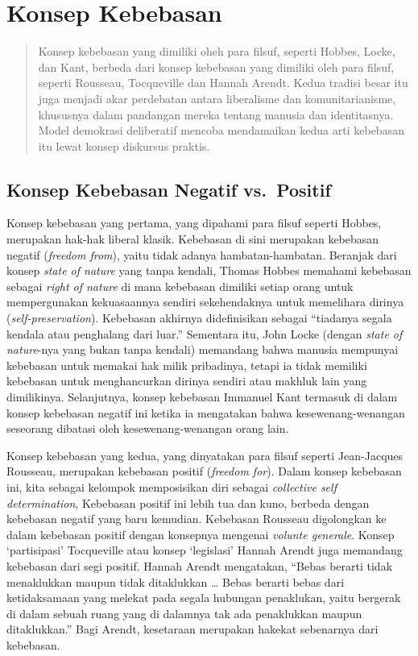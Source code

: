 \documentclass[11pt,twoside,a5paper,openany]{memoir}
\begin{document}
\hypertarget{konsep-kebebasan}{%
\section{Konsep Kebebasan}\label{konsep-kebebasan}}

\begin{quote}
Konsep kebebasan yang dimiliki oheh para filsuf, seperti Hobbes, Locke,
dan Kant, berbeda dari konsep kebebasan yang dimiliki oleh para filsuf,
seperti Rousseau, Tocqueville dan Hannah Arendt. Kedua tradisi besar itu
juga menjadi akar perdebatan antara liberalisme dan komunitarianisme,
khususnya dalam pandangan mereka tentang manusia dan identitasnya. Model
demokrasi deliberatif mencoba mendamaikan kedua arti kebebasan itu lewat
konsep diskursus praktis.
\end{quote}

\hypertarget{konsep-kebebasan-negatif-vs.-positif}{%
\subsection{Konsep Kebebasan Negatif
vs.~Positif}\label{konsep-kebebasan-negatif-vs.-positif}}

Konsep kebebasan yang pertama, yang dipahami para filsuf seperti Hobbes,
merupakan hak-hak liberal klasik. Kebebasan di sini merupakan kebebasan
negatif (\emph{freedom from}), yaitu tidak adanya hambatan-hambatan.
Beranjak dari konsep \emph{state of nature} yang tanpa kendali, Thomas
Hobbes memahami kebebasan sebagai \emph{right of nature} di mana
kebebasan dimiliki setiap orang untuk mempergunakan kekuasaannya sendiri
sekehendaknya untuk memelihara dirinya (\emph{self-preservation}).
Kebebasan akhirnya didefinisikan sebagai ``tiadanya segala kendala atau
penghalang dari luar.'' Sementara itu, John Locke (dengan \emph{state of
nature}-nya yang bukan tanpa kendali) memandang bahwa manusia mempunyai
kebebasan untuk memakai hak milik pribadinya, tetapi ia tidak memiliki
kebebasan untuk menghancurkan dirinya sendiri atau makhluk lain yang
dimilikinya. Selanjutnya, konsep kebebasan Immanuel Kant termasuk di
dalam konsep kebebasan negatif ini ketika ia mengatakan bahwa
kesewenang-wenangan seseorang dibatasi oleh kesewenang-wenangan orang
lain.

Konsep kebebasan yang kedua, yang dinyatakan para filsuf seperti
Jean-Jacques Rousseau, merupakan kebebasan positif (\emph{freedom for}).
Dalam konsep kebebasan ini, kita sebagai kelompok memposisikan diri
sebagai \emph{collective self determination}, Kebebasan positif ini
lebih tua dan kuno, berbeda dengan kebebasan negatif yang baru kemudian.
Kebebasan Rousseau digolongkan ke dalam kebebasan positif dengan
konsepnya mengenai \emph{volunte generale}. Konsep `partisipasi'
Tocqueville atau konsep `legislasi' Hannah Arendt juga memandang
kebebasan dari segi positif. Hannah Arendt mengatakan, ``Bebas berarti
tidak menaklukkan maupun tidak ditaklukkan \ldots{} Bebas berarti bebas
dari ketidaksamaan yang melekat pada segala hubungan penaklukan, yaitu
bergerak di dalam sebuah ruang yang di dalamnya tak ada penaklukkan
maupun ditaklukkan.'' Bagi Arendt, kesetaraan merupakan hakekat
sebenarnya dari kebebasan.
\end{document}
